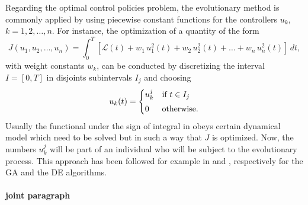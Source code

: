 Regarding the optimal control policies problem, the evolutionary 
method is commonly applied by using piecewise constant functions for the 
controllers $u_k$, $k=1,2,\dots,n$. For instance, the optimization of a
quantity of the form
\begin{equation}
  J(u_1,u_2,\dots,u_n) = \int_0^T{\left[ \mathcal{L}(t) + w_1\,u_1^2(t) + 
  w_2\,u_2^2(t)+\dots + w_n\,u_n^2(t) \right]\,dt},
\label{eq:Jaccion}
\end{equation}
with weight constants $w_k$, can be conducted by discretizing the 
interval $I = [0,T]$ in disjoints subintervals $I_j$ and choosing  
\begin{equation}\label{DECrossover}
  u_{k}(t) =
  \begin{cases}
    u^j_{k} & \text{if $t \in I_j$}
      \vspace*{0.1cm}\\
      0 & \text{otherwise.}
  \end{cases}
\end{equation}
  Usually the functional under the sign of integral in 
obeys certain dynamical model which need to be solved but in such a way
that $J$ is optimized. Now, the numbers $u^j_{k}$ will be part of an 
individual who will be subject to the evolutionary process. This approach 
has been followed for example in \cite{Yan2008} and \cite{Jang2018}, 
respectively for the GA and the DE algorithms.

\paragraph{joint paragraph}

